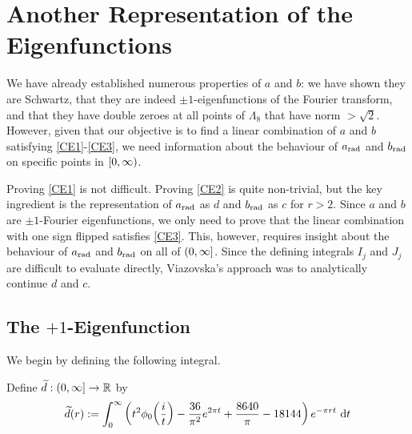 \section{Another Representation of the Eigenfunctions}

We have already established numerous properties of $a$ and $b$: we have shown they are Schwartz, that they are indeed $\pm1$-eigenfunctions of the Fourier transform, and that they have double zeroes at all points of $\Lambda_8$ that have norm $> \sqrt{2}$. However, given that our objective is to find a linear combination of $a$ and $b$ satisfying \ref{CE1}-\ref{CE3}, we need information about the behaviour of $a_{\operatorname{rad}}$ and $b_{\operatorname{rad}}$ on specific points in $\left[0, \infty\right)$.

Proving \ref{CE1} is not difficult. Proving \ref{CE2} is quite non-trivial, but the key ingredient is the representation of $a_{\operatorname{rad}}$ as $d$ and $b_{\operatorname{rad}}$ as $c$ for $r > 2$. Since $a$ and $b$ are $\pm 1$-Fourier eigenfunctions, we only need to prove that the linear combination with one sign flipped satisfies \ref{CE3}. This, however, requires insight about the behaviour of $a_{\operatorname{rad}}$ and $b_{\operatorname{rad}}$ on all of $\left(0, \infty\right]$. Since the defining integrals $I_j$ and $J_j$ are difficult to evaluate directly, Viazovska's approach was to analytically continue $d$ and $c$.

\subsection{The $+1$-Eigenfunction}

We begin by defining the following integral.

\begin{boxdefinition}
    Define $\widetilde{d} : \left(0, \infty\right] \to \mathbb{R}$ by
    \begin{align*}
        \widetilde{d}(r) := \int_{0}^{\infty} \left( t^2 \phi_0\!\left( \frac{i}{t} \right) - \frac{36}{\pi^2}e^{2\pi t} + \frac{8640}{\pi} - 18144 \right) e^{-\pi r t} \, \operatorname{d}\!{t}
    \end{align*}
\end{boxdefinition}

